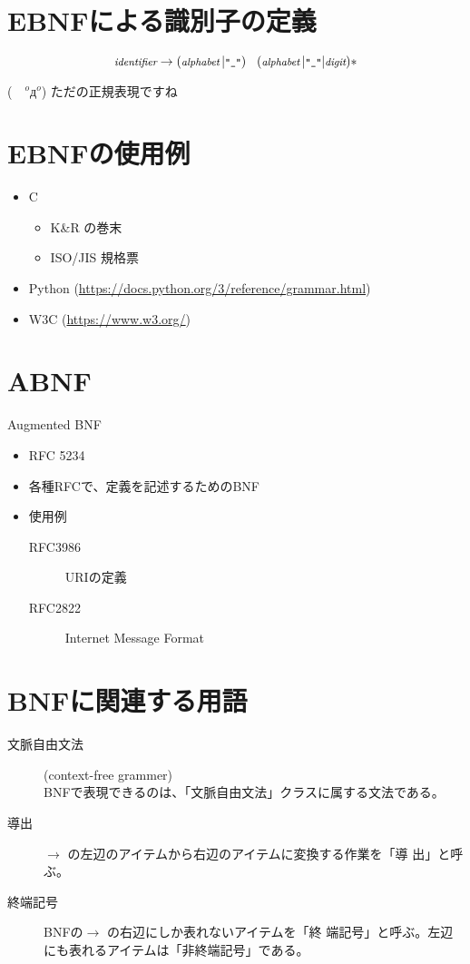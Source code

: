 \documentclass[slide,papersize,fleqn,22pt]{jsarticle}
\begin{document}
\section{EBNFによる識別子の定義}
\[
\footnotesize
\textit{identifier} \rightarrow (\textit{alphabet}\,|\texttt{"\_"})\quad(\textit{alphabet}\,|\texttt{"\_"}|\textit{digit})*
\]

\tiny
(　$^oд^o$) ただの正規表現ですね
\normalsize
\section{EBNFの使用例}
\begin{itemize}
\item C
  \begin{itemize}
  \item K\&R の巻末
  \item ISO/JIS 規格票
  \end{itemize}
\item Python {\tiny(\url{https://docs.python.org/3/reference/grammar.html})}
\item W3C {\tiny(\url{https://www.w3.org/})}
\end{itemize}



\section{ABNF}
Augmented BNF
\begin{itemize}
\item RFC 5234
\item 各種RFCで、定義を記述するためのBNF
\item 使用例
  \begin{description}
  \item[RFC3986] URIの定義
    \item[RFC2822] Internet Message Format
  \end{description}
\end{itemize}

\section{BNFに関連する用語}
\begin{description}
\item[文脈自由文法] (context-free grammer) \\
  BNFで表現できるのは、「文脈自由文法」クラスに属する文法である。
\item[導出]
  $\rightarrow$ の左辺のアイテムから右辺のアイテムに変換する作業を「導
  出」と呼ぶ。
\item[終端記号] BNFの$\rightarrow$ の右辺にしか表れないアイテムを「終
  端記号」と呼ぶ。左辺にも表れるアイテムは「非終端記号」である。
\end{description}
\end{document}
